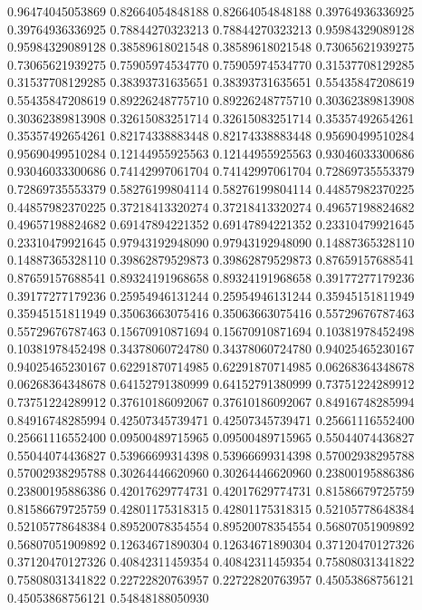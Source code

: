    0.96474045053869   0.82664054848188
   0.82664054848188   0.39764936336925
   0.39764936336925   0.78844270323213
   0.78844270323213   0.95984329089128
   0.95984329089128   0.38589618021548
   0.38589618021548   0.73065621939275
   0.73065621939275   0.75905974534770
   0.75905974534770   0.31537708129285
   0.31537708129285   0.38393731635651
   0.38393731635651   0.55435847208619
   0.55435847208619   0.89226248775710
   0.89226248775710   0.30362389813908
   0.30362389813908   0.32615083251714
   0.32615083251714   0.35357492654261
   0.35357492654261   0.82174338883448
   0.82174338883448   0.95690499510284
   0.95690499510284   0.12144955925563
   0.12144955925563   0.93046033300686
   0.93046033300686   0.74142997061704
   0.74142997061704   0.72869735553379
   0.72869735553379   0.58276199804114
   0.58276199804114   0.44857982370225
   0.44857982370225   0.37218413320274
   0.37218413320274   0.49657198824682
   0.49657198824682   0.69147894221352
   0.69147894221352   0.23310479921645
   0.23310479921645   0.97943192948090
   0.97943192948090   0.14887365328110
   0.14887365328110   0.39862879529873
   0.39862879529873   0.87659157688541
   0.87659157688541   0.89324191968658
   0.89324191968658   0.39177277179236
   0.39177277179236   0.25954946131244
   0.25954946131244   0.35945151811949
   0.35945151811949   0.35063663075416
   0.35063663075416   0.55729676787463
   0.55729676787463   0.15670910871694
   0.15670910871694   0.10381978452498
   0.10381978452498   0.34378060724780
   0.34378060724780   0.94025465230167
   0.94025465230167   0.62291870714985
   0.62291870714985   0.06268364348678
   0.06268364348678   0.64152791380999
   0.64152791380999   0.73751224289912
   0.73751224289912   0.37610186092067
   0.37610186092067   0.84916748285994
   0.84916748285994   0.42507345739471
   0.42507345739471   0.25661116552400
   0.25661116552400   0.09500489715965
   0.09500489715965   0.55044074436827
   0.55044074436827   0.53966699314398
   0.53966699314398   0.57002938295788
   0.57002938295788   0.30264446620960
   0.30264446620960   0.23800195886386
   0.23800195886386   0.42017629774731
   0.42017629774731   0.81586679725759
   0.81586679725759   0.42801175318315
   0.42801175318315   0.52105778648384
   0.52105778648384   0.89520078354554
   0.89520078354554   0.56807051909892
   0.56807051909892   0.12634671890304
   0.12634671890304   0.37120470127326
   0.37120470127326   0.40842311459354
   0.40842311459354   0.75808031341822
   0.75808031341822   0.22722820763957
   0.22722820763957   0.45053868756121
   0.45053868756121   0.54848188050930
